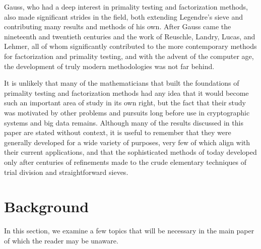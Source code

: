 \documentclass{article}
\begin{document}
\par Gauss, who had a deep interest in primality testing and factorization methods, also made significant strides in the field, both extending Legendre's sieve and contributing many results and methods of his own. After Gauss came the nineteenth and twentieth centuries and the work of Reuschle, Landry, Lucas, and Lehmer, all of whom significantly contributed to the more contemporary methods for factorization and primality testing, and with the advent of the computer age, the development of truly modern methodologies was not far behind. 
\par It is unlikely that many of the mathematicians that built the foundations of primality testing and factorization methods had any idea that it would become such an important area of study in its own right, but the fact that their study was motivated by other problems and pursuits long before use in cryptographic systems and big data remains. Although many of the results discussed in this paper are stated without context, it is useful to remember that they were generally developed for a wide variety of purposes, very few of which align with their current applications, and that the sophisticated methods of today developed only after centuries of refinements made to the crude elementary techniques of trial division and straightforward sieves.


\section{Background}\label{Background}

In this section, we examine a few topics that will be necessary in the main paper of which the reader may be unaware. 
\end{document}
